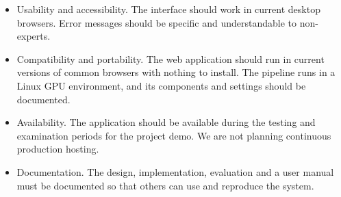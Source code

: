\documentclass{FastFyp}
\begin{document}
\begin{itemize}
\item Usability and accessibility. The interface should work in current desktop browsers. Error messages should be specific and understandable to non-experts.
\item Compatibility and portability. The web application should run in current versions of common browsers with nothing to install. The pipeline runs in a Linux GPU environment, and its components and settings should be documented.
\item Availability. The application should be available during the testing and examination periods for the project demo. We are not planning continuous production hosting.
\item Documentation. The design, implementation, evaluation and a user manual must be documented so that others can use and reproduce the system.
\end{itemize}
\end{document}
